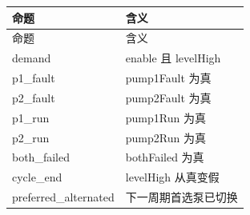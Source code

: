 \begin{longtable}{L{3.3cm}L{10.0cm}}

\toprule

命题 & 含义\\

\midrule

\endfirsthead

\toprule

命题 & 含义\\

\midrule

\endhead

{\ttfamily demand} & enable 且 levelHigh\\

{\ttfamily p1\_fault} & pump1Fault 为真\\

{\ttfamily p2\_fault} & pump2Fault 为真\\

{\ttfamily p1\_run} & pump1Run 为真\\

{\ttfamily p2\_run} & pump2Run 为真\\

{\ttfamily both\_failed} & bothFailed 为真\\

{\ttfamily cycle\_end} & levelHigh 从真变假\\

{\ttfamily preferred\_alternated} & 下一周期首选泵已切换\\

\bottomrule

\end{longtable}


